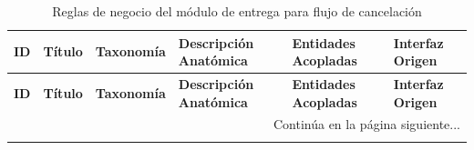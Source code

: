 \begin{landscape}
\begin{longtable}[c]{l p{2.1cm} p{2.1cm} p{8cm} p{4cm} p{3cm}}
\caption{Reglas de negocio del módulo de entrega para flujo de cancelación} \label{tab:reglas-negocio-entrega-flujo-cancelacion}\\
\toprule
\textbf{ID} & \textbf{Título} & \textbf{Taxonomía} & \textbf{Descripción Anatómica} & \textbf{Entidades Acopladas} & \textbf{Interfaz Origen} \\
\midrule
\endfirsthead

\toprule
\textbf{ID} & \textbf{Título} & \textbf{Taxonomía} & \textbf{Descripción Anatómica} & \textbf{Entidades Acopladas} & \textbf{Interfaz Origen} \\
\midrule
\endhead

\midrule
\multicolumn{6}{r}{\small Continúa en la página siguiente...} \\
\endfoot
\bottomrule
\endlastfoot


\end{longtable}
\end{landscape}
